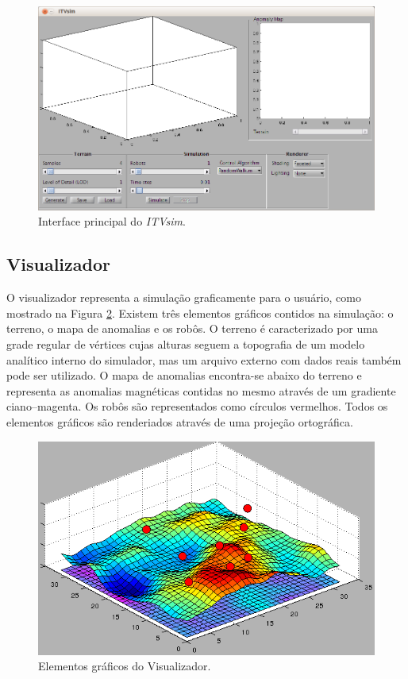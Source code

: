 \documentclass[11pt,a4paper]{article}
\begin{document}
\begin{figure}[htpb]
  \centering
  \includegraphics[width=\textwidth]{ITVsim.png}
  \caption{Interface principal do \textit{ITVsim}.}
  \label{fig:principal}
\end{figure}

\subsection{Visualizador}
\label{sec:visualizer}

O visualizador representa a simulação graficamente para o usuário,
como mostrado na Figura \ref{fig:visualizer}. Existem três elementos
gráficos contidos na simulação: o terreno, o mapa de anomalias e os
robôs. O terreno é caracterizado por uma grade regular de vértices
cujas alturas seguem a topografia de um modelo analítico interno do
simulador, mas um arquivo externo com dados reais também pode ser
utilizado. O mapa de anomalias encontra-se abaixo do terreno e
representa as anomalias magnéticas contidas no mesmo através de um
gradiente ciano--magenta. Os robôs são representados como círculos
vermelhos. Todos os elementos gráficos são renderiados através de uma
projeção ortográfica.

\begin{figure}[htpb]
  \centering
  \includegraphics[width=\textwidth]{visualizer.png}
  \caption{Elementos gráficos do Visualizador.}
  \label{fig:visualizer}
\end{figure}
\end{document}
